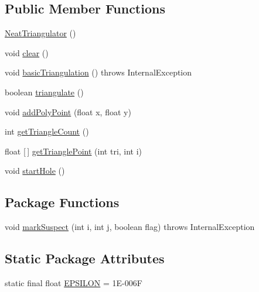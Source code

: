 \subsection*{Public Member Functions}
\begin{DoxyCompactItemize}
\item 
\mbox{\hyperlink{classorg_1_1newdawn_1_1slick_1_1geom_1_1_neat_triangulator_aa62b863de4b884975e744a452dd2f280}{Neat\+Triangulator}} ()
\item 
void \mbox{\hyperlink{classorg_1_1newdawn_1_1slick_1_1geom_1_1_neat_triangulator_a907a9806c7f97a03fb7f450e64d93a13}{clear}} ()
\item 
void \mbox{\hyperlink{classorg_1_1newdawn_1_1slick_1_1geom_1_1_neat_triangulator_ab1c1949c138da4b2c29a47c5326059e0}{basic\+Triangulation}} ()  throws Internal\+Exception     
\item 
boolean \mbox{\hyperlink{classorg_1_1newdawn_1_1slick_1_1geom_1_1_neat_triangulator_a32227a64f0e7142d40d79a1adb3fdb24}{triangulate}} ()
\item 
void \mbox{\hyperlink{classorg_1_1newdawn_1_1slick_1_1geom_1_1_neat_triangulator_a6203fd3d4b9892789ebd3512d6cb403f}{add\+Poly\+Point}} (float x, float y)
\item 
int \mbox{\hyperlink{classorg_1_1newdawn_1_1slick_1_1geom_1_1_neat_triangulator_a9974151d5e703dc37326ac89f8db1de1}{get\+Triangle\+Count}} ()
\item 
float \mbox{[}$\,$\mbox{]} \mbox{\hyperlink{classorg_1_1newdawn_1_1slick_1_1geom_1_1_neat_triangulator_a286bb2dbff64783e498ec5b41003fb03}{get\+Triangle\+Point}} (int tri, int i)
\item 
void \mbox{\hyperlink{classorg_1_1newdawn_1_1slick_1_1geom_1_1_neat_triangulator_ae035b8f5385bd2284cecd4fa1b98c2bc}{start\+Hole}} ()
\end{DoxyCompactItemize}
\subsection*{Package Functions}
\begin{DoxyCompactItemize}
\item 
void \mbox{\hyperlink{classorg_1_1newdawn_1_1slick_1_1geom_1_1_neat_triangulator_a68d436b8465e95a2fc44584e9c6f77f0}{mark\+Suspect}} (int i, int j, boolean flag)  throws Internal\+Exception     
\end{DoxyCompactItemize}
\subsection*{Static Package Attributes}
\begin{DoxyCompactItemize}
\item 
static final float \mbox{\hyperlink{classorg_1_1newdawn_1_1slick_1_1geom_1_1_neat_triangulator_a3591ad18c067004e78b06217362e3d7b}{E\+P\+S\+I\+L\+ON}} = 1\+E-\/006F
\end{DoxyCompactItemize}
